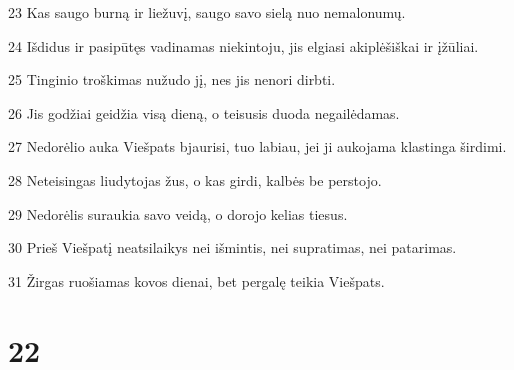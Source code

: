 \par 23 Kas saugo burną ir liežuvį, saugo savo sielą nuo nemalonumų. 
\par 24 Išdidus ir pasipūtęs vadinamas niekintoju, jis elgiasi akiplėšiškai ir įžūliai. 
\par 25 Tinginio troškimas nužudo jį, nes jis nenori dirbti. 
\par 26 Jis godžiai geidžia visą dieną, o teisusis duoda negailėdamas. 
\par 27 Nedorėlio auka Viešpats bjaurisi, tuo labiau, jei ji aukojama klastinga širdimi. 
\par 28 Neteisingas liudytojas žus, o kas girdi, kalbės be perstojo. 
\par 29 Nedorėlis suraukia savo veidą, o dorojo kelias tiesus. 
\par 30 Prieš Viešpatį neatsilaikys nei išmintis, nei supratimas, nei patarimas. 
\par 31 Žirgas ruošiamas kovos dienai, bet pergalę teikia Viešpats.



\chapter{22}


